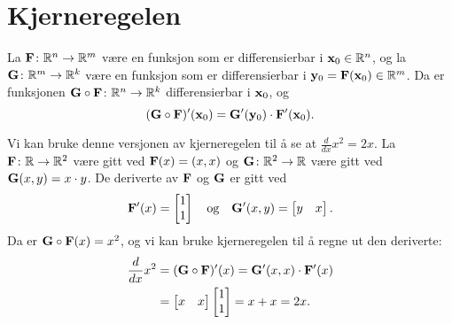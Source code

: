 \section*{Kjerneregelen}
\begin{teorem}[Kjerneregelen]
  \label{kjerneregelen}
  La $\mathbf{F} \colon \mathbb{R}^n \to \mathbb{R}^m$ være en funksjon som er differensierbar i
  $\mathbf{x}_0 \in \mathbb{R}^n$, og la $\mathbf{G} \colon \mathbb{R}^m \to \mathbb{R}^k$ være en funksjon som er
  differensierbar i $\mathbf{y}_0 = \mathbf{F}(\mathbf{x}_0) \in \mathbb{R}^m$. Da er funksjonen $\mathbf{G} \circ \mathbf{F} \colon \mathbb{R}^n \to
  \mathbb{R}^k$ differensierbar i $\mathbf{x}_0$, og
  $$(\mathbf{G} \circ \mathbf{F})'(\mathbf{x}_0) =  \mathbf{G}'(\mathbf{y}_0) \cdot  \mathbf{F}'(\mathbf{x}_0).$$
\end{teorem}

\begin{eksempel}
  Vi kan bruke denne versjonen av kjerneregelen til å se at $\frac{d}{dx} x^2 =
  2x$. La $\mathbf{F} \colon \mathbb{R} \to \mathbb{R}^2$ være gitt ved $\mathbf{F}(x) = (x, x)$ og $\mathbf{G} \colon
  \mathbb{R}^2 \to \mathbb{R}$ være gitt ved $\mathbf{G}(x, y) = x \cdot y$.
  De deriverte av $\mathbf{F}$ og $\mathbf{G}$ er gitt ved
  $$\mathbf{F}'(x) = \begin{bmatrix} 1 \\ 1 \end{bmatrix} \quad \text{og} \quad \mathbf{G}'(x, y)
  = \begin{bmatrix} y & x \end{bmatrix}.$$
  Da er $\mathbf{G} \circ \mathbf{F}(x) = x^2$,
  og vi kan bruke kjerneregelen til å regne ut den deriverte:
  \begin{align*}
    \frac{d}{dx} x^2 &= (\mathbf{G} \circ \mathbf{F})'(x) = \mathbf{G}'(x, x) \cdot \mathbf{F}'(x) \\
    &= \begin{bmatrix} x & x \end{bmatrix} \begin{bmatrix} 1 \\ 1 \end{bmatrix} = x + x = 2x.
    \end{align*}
\end{eksempel}

